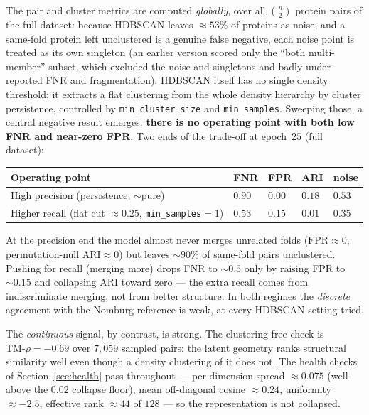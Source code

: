 \documentclass[11pt,a4paper]{article}
\theoremstyle{definition}
\begin{document}
The pair and cluster metrics are computed \emph{globally}, over all $\binom{n}{2}$
protein pairs of the full dataset: because HDBSCAN leaves $\approx 53\%$ of proteins as
noise, and a same-fold protein left unclustered is a genuine false negative, each noise
point is treated as its own singleton (an earlier version scored only the ``both
multi-member'' subset, which excluded the noise and singletons and badly under-reported
FNR and fragmentation). HDBSCAN itself has no single density threshold: it extracts a
flat clustering from the whole density hierarchy by cluster persistence, controlled by
\texttt{min\_cluster\_size} and \texttt{min\_samples}. Sweeping those, a central
negative result emerges: \textbf{there is no operating point with both low FNR and
near-zero FPR}. Two ends of the trade-off at epoch~$25$ (full dataset):

\begin{center}
\begin{tabular}{@{}l l l l l@{}}
\toprule
Operating point & FNR & FPR & ARI & noise\\
\midrule
High precision (persistence, $\sim$pure) & $0.90$ & $0.00$ & $0.18$ & $0.53$\\
Higher recall (flat cut $\approx0.25$, \texttt{min\_samples}$=1$) & $0.53$ & $0.15$ & $0.01$ & $0.35$\\
\bottomrule
\end{tabular}
\end{center}

At the precision end the model almost never merges unrelated folds
($\mathrm{FPR}\approx 0$, permutation-null $\mathrm{ARI}\approx 0$) but leaves
$\sim 90\%$ of same-fold pairs unclustered. Pushing for recall (merging more) drops FNR
to $\sim 0.5$ only by raising FPR to $\sim 0.15$ and collapsing ARI toward zero --- the
extra recall comes from indiscriminate merging, not from better structure. In both
regimes the \emph{discrete} agreement with the Nomburg reference is weak, at every
HDBSCAN setting tried.

The \emph{continuous} signal, by contrast, is strong. The clustering-free check is
$\mathrm{TM}\text{-}\rho = -0.69$ over $7{,}059$ sampled pairs: the latent geometry
ranks structural similarity well even though a density clustering of it does not. The
health checks of Section~\ref{sec:health} pass throughout --- per-dimension spread
$\approx 0.075$ (well above the $0.02$ collapse floor), mean off-diagonal cosine
$\approx 0.24$, uniformity $\approx -2.5$, effective rank $\approx 44$ of $128$ --- so
the representation is not collapsed.
\end{document}
